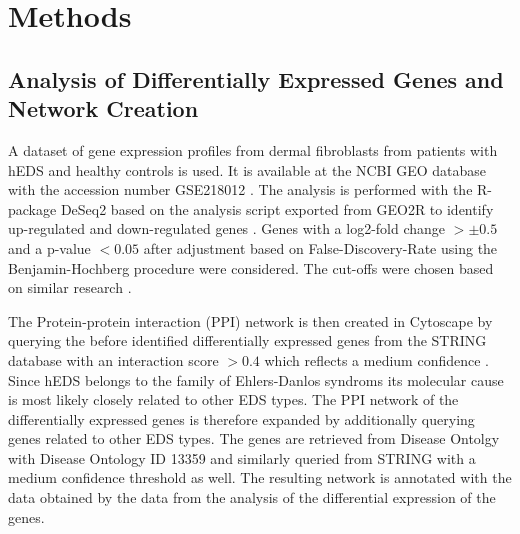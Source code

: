 \section{Methods}

\subsection{Analysis of Differentially Expressed Genes and Network Creation}\label{sec:methods-deg}
A dataset of gene expression profiles from dermal fibroblasts from patients with hEDS and healthy controls is used. It is available at the NCBI GEO database with the accession number GSE218012 \cite{Ritelli2020}. The analysis is performed with the R-package DeSeq2 based on the analysis script exported from GEO2R to identify up-regulated and down-regulated genes \cite{DESeq2}. Genes with a log2-fold change $> \pm 0.5$ and a p-value $< 0.05$ after adjustment based on False-Discovery-Rate using the Benjamin-Hochberg procedure were considered. The cut-offs were chosen based on similar research \cite{Karimizadeh2019, Lim2019}.

The Protein-protein interaction (PPI) network is then created in Cytoscape \cite{Cytoscape} by querying the before identified differentially expressed genes from the STRING database with an interaction score $> 0.4$ which reflects a medium confidence \cite{StringDB}. Since hEDS belongs to the family of Ehlers-Danlos syndroms its molecular cause is most likely closely related to other EDS types. The PPI network of the differentially expressed genes is therefore expanded by additionally querying genes related to other EDS types. The genes are retrieved from Disease Ontolgy with Disease Ontology ID 13359 \cite{DO} and similarly queried from STRING with a medium confidence threshold as well. The resulting network is annotated with the data obtained by the data from the analysis of the differential expression of the genes.

